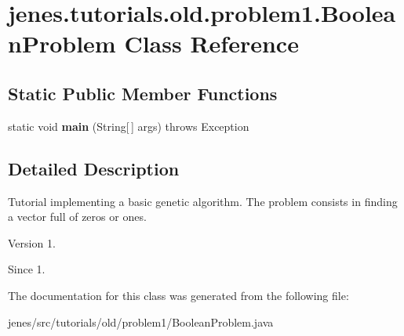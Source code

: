 \hypertarget{classjenes_1_1tutorials_1_1old_1_1problem1_1_1_boolean_problem}{\section{jenes.\-tutorials.\-old.\-problem1.\-Boolean\-Problem Class Reference}
\label{classjenes_1_1tutorials_1_1old_1_1problem1_1_1_boolean_problem}
}
\subsection*{Static Public Member Functions}
\begin{DoxyCompactItemize}
\item 
\hypertarget{classjenes_1_1tutorials_1_1old_1_1problem1_1_1_boolean_problem_a122005d28decbbdf9c0676bc5870dfd4}{static void {\bfseries main} (String\mbox{[}$\,$\mbox{]} args)  throws Exception }\label{classjenes_1_1tutorials_1_1old_1_1problem1_1_1_boolean_problem_a122005d28decbbdf9c0676bc5870dfd4}

\end{DoxyCompactItemize}


\subsection{Detailed Description}
Tutorial implementing a basic genetic algorithm. The problem consists in finding a vector full of zeros or ones.

\begin{DoxyVersion}{Version}
1.
\end{DoxyVersion}
\begin{DoxySince}{Since}
1. 
\end{DoxySince}


The documentation for this class was generated from the following file\-:\begin{DoxyCompactItemize}
\item 
jenes/src/tutorials/old/problem1/Boolean\-Problem.\-java\end{DoxyCompactItemize}
